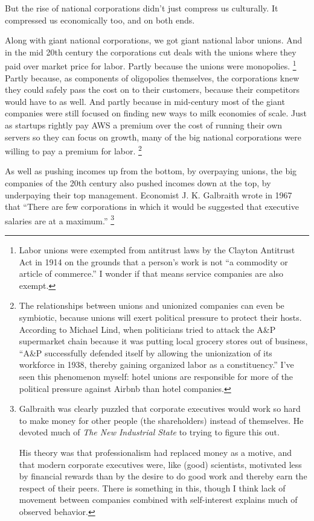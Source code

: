 \documentclass[12pt]{book}
\begin{document}
But the rise of national corporations didn't just compress us
culturally. It compressed us economically too, and on both ends.

Along with giant national corporations, we got giant national labor
unions. And in the mid 20th century the corporations cut deals with the
unions where they paid over market price for labor. Partly because the
unions were monopolies. \footnote{Labor unions were exempted from antitrust laws by the Clayton
Antitrust Act in 1914 on the grounds that a person's work is not ``a
commodity or article of commerce.'' I wonder if that means service
companies are also exempt.} Partly because, as
components of oligopolies themselves, the corporations knew they could
safely pass the cost on to their customers, because their competitors
would have to as well. And partly because in mid-century most of the
giant companies were still focused on finding new ways to milk economies
of scale. Just as startups rightly pay AWS a premium over the cost of
running their own servers so they can focus on growth, many of the big
national corporations were willing to pay a premium for labor.
\footnote{The relationships between unions and unionized companies can
even be symbiotic, because unions will exert political pressure to
protect their hosts. According to Michael Lind, when politicians tried
to attack the A\&P supermarket chain because it was putting local
grocery stores out of business, ``A\&P successfully defended itself by
allowing the unionization of its workforce in 1938, thereby gaining
organized labor as a constituency.'' I've seen this phenomenon myself:
hotel unions are responsible for more of the political pressure against
Airbnb than hotel companies.}

As well as pushing incomes up from the bottom, by overpaying unions, the
big companies of the 20th century also pushed incomes down at the top,
by underpaying their top management. Economist J. K. Galbraith wrote in
1967 that ``There are few corporations in which it would be suggested
that executive salaries are at a maximum.'' \footnote{Galbraith was clearly puzzled that corporate executives would
work so hard to make money for other people (the shareholders) instead
of themselves. He devoted much of \emph{The New Industrial State} to
trying to figure this out.

His theory was that professionalism had replaced money as a motive, and
that modern corporate executives were, like (good) scientists, motivated
less by financial rewards than by the desire to do good work and thereby
earn the respect of their peers. There is something in this, though I
think lack of movement between companies combined with self-interest
explains much of observed behavior.}
\end{document}
